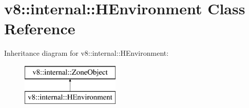 \hypertarget{classv8_1_1internal_1_1_h_environment}{}\section{v8\+:\+:internal\+:\+:H\+Environment Class Reference}
\label{classv8_1_1internal_1_1_h_environment}
Inheritance diagram for v8\+:\+:internal\+:\+:H\+Environment\+:\begin{figure}[H]
\begin{center}
\leavevmode
\includegraphics[height=2.000000cm]{classv8_1_1internal_1_1_h_environment}
\end{center}
\end{figure}
